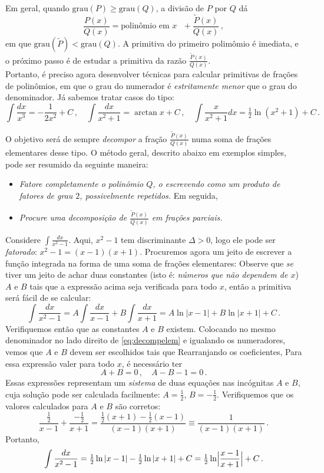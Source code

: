 Em geral, quando $\mathrm{grau}(P)\geq \mathrm{grau}(Q)$, 
a divisão de $P$ por $Q$ dá
$$\frac{P(x)}{Q(x)}=\text{polinômio em $x$ }+\frac{\widetilde{P}(x)}{Q(x)}\,,
$$
em 
que $\mathrm{grau}(\widetilde{P})<\mathrm{grau}(Q)$. A primitiva do primeiro 
polimômio é imediata, e o próximo passo é de estudar a primitiva da razão
$\frac{\widetilde{P}(x)}{Q(x)}$.\\

Portanto, é preciso agora desenvolver técnicas para calcular primitivas de
frações de polinômios, em que o grau do numerador é \emph{estritamente menor}
que o grau do denominador. Já sabemos tratar casos do tipo:
$$\int\frac{dx}{x^3}=-\frac{1}{2x^2}+C\,,\quad \int\frac{dx}{x^2+1}=\arctan
x+C\,,\quad \int\frac{x}{x^2+1}dx=\tfrac12 \ln (x^2+1)+C\,.$$

O objetivo será de sempre \emph{decompor} a fração
$\frac{\widetilde{P}(x)}{Q(x)}$ numa soma de frações elementares desse tipo.
O método geral, descrito abaixo em exemplos simples, pode
ser resumido da seguinte maneira:
\begin{itemize}
\item \emph{Fatore completamente o polinômio $Q$, o escrevendo como um produto
de fatores de grau $2$, possivelmente repetidos.} Em seguida,
\item \emph{Procure uma decomposição de $\frac{\widetilde{P}(x)}{Q(x)}$ em
frações parciais.}
\end{itemize}

\begin{ex}\label{Ex:unsurxdeuxmun}
Considere $\int \frac{dx}{x^2-1}$. Aqui, $x^2-1$ tem discriminante $\Delta>0$,
logo ele pode ser \emph{fatorado}: $x^2-1=(x-1)(x+1)$. Procuremos agora um
jeito de escrever a função integrada na forma de uma
soma de frações elementares:
Observe que \emph{se} tiver um jeito de achar duas
constantes (isto é: \emph{números que não dependem de $x$}) $A$ e $B$ tais
que a expressão acima seja verificada para todo $x$, então a primitiva será
fácil de se calcular:
$$
\int\frac{dx}{x^2-1}=A\int\frac{dx}{x-1}+B\int\frac{dx}{x+1}=A\ln
|x-1|+B\ln|x+1|+C\,.
$$
Verifiquemos então que as constantes $A$ e $B$ existem. Colocando no mesmo
denominador no lado direito de \eqref{eq:decompelem} e igualando os
numeradores, vemos que $A$ e $B$ devem ser escolhidos tais que
Rearranjando os coeficientes, 
Para essa expressão valer para todo $x$, é necessário ter 
$$
A+B=0\,,\quad A-B-1=0\,.
$$
Essas expressões representam um \emph{sistema} de duas equações nas
incógnitas $A$ e $B$, cuja solução pode ser calculada facilmente:
$A=\tfrac12$, $B=-\tfrac12$.
Verifiquemos que os valores calculados para $A$ e $B$ são
corretos:
$$
\frac{\tfrac12}{x-1}
+\frac{-\tfrac12}{x+1}=\frac{\tfrac12 (x+1)-\tfrac12(x-1)}{(x-1)(x+1)}
\equiv \frac{1}{(x-1)(x+1)}\,.
$$
Portanto, 
$$\int\frac{dx}{x^2-1}=\tfrac12\ln
|x-1|-\tfrac12\ln|x+1|+C=\tfrac12\ln \Bigl|\frac{x-1}{x+1}\Bigr|+C\,.$$
\end{ex}


